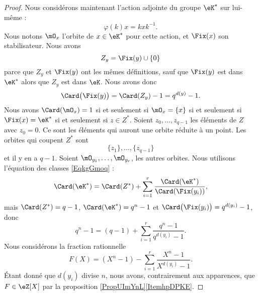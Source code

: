 \begin{proof}
    Nous considérons maintenant l'action adjointe du groupe \( \eK^*\) sur lui-même :
    \begin{equation}
        \varphi(k)x=kxk^{-1}.
    \end{equation}
    Nous notons \( \mO_x\) l'orbite de \( x\in \eK^*\) pour cette action, et \( \Fix(x)\) son stabilisateur. Nous avons
    \begin{equation}
        Z_y=\Fix(y)\cup\{ 0 \}
    \end{equation}
    parce que \( Z_y\) et \( \Fix(y)\) ont les mêmes définitions, sauf que \( \Fix(y)\) est dans \( \eK^*\) alors que \( Z_y\) est dans \( \eK\). Nous avons donc
    \begin{equation}
        \Card\big( \Fix(y) \big)=\Card(Z_y)-1=q^{d(y)}-1.
    \end{equation}
    Nous avons \( \Card(\mO_x)=1\) si et seulement si \( \mO_x=\{ x \}\) si et seulement si \( \Fix(x)=\eK^*\) si et seulement si \( z\in Z^*\). Soient \( z_0,\ldots, z_{q-1}\) les éléments de \( Z\) avec \( z_0=0\). Ce sont les éléments qui auront une orbite réduite à un point. Les orbites qui coupent \( Z^*\) sont
    \begin{equation}
        \{ z_1 \},\ldots, \{ z_{q-1} \}
    \end{equation}
    et il y en a \( q-1\). Soient \( \mO_{y_1},\ldots, \mO_{y_r}\), les autres orbites. Nous utilisons l'équation des classes \eqref{EqkgGmoq} :
    \begin{equation}
        \Card(\eK^*)=\Card(Z^*)+\sum_{i=1}^{r}\frac{ \Card(\eK^*) }{ \Card(\Fix(y_i)) },
    \end{equation}
    mais \( \Card(Z^*)=q-1\), \( \Card(\eK^*)=q^n-1\) et \( \Card\big( \Fix(y_i) \big)=q^{d(y_i)}-1\), donc
    \begin{equation}        \label{EqBPBDzE}
        q^n-1=(q-1)+\sum_{i=1}^{r}\frac{ q^n-1 }{ q^{d(y_i)}-1 }.
    \end{equation}
    Nous considérons la fraction rationnelle
    \begin{equation}        \label{EqATGciu}
        F(X)=(X^n-1)-\sum_{i=1}^{r}\frac{ X^n-1 }{ X^{d(y_i)}-1 }.
    \end{equation}
    Étant donné que \( d(y_i)\) divise \( n\), nous avons, contrairement aux apparences, que \( F\in \eZ[X]\) par la proposition \ref{PropUImYnL}\ref{ItemhpDPKE}.


\end{proof}
